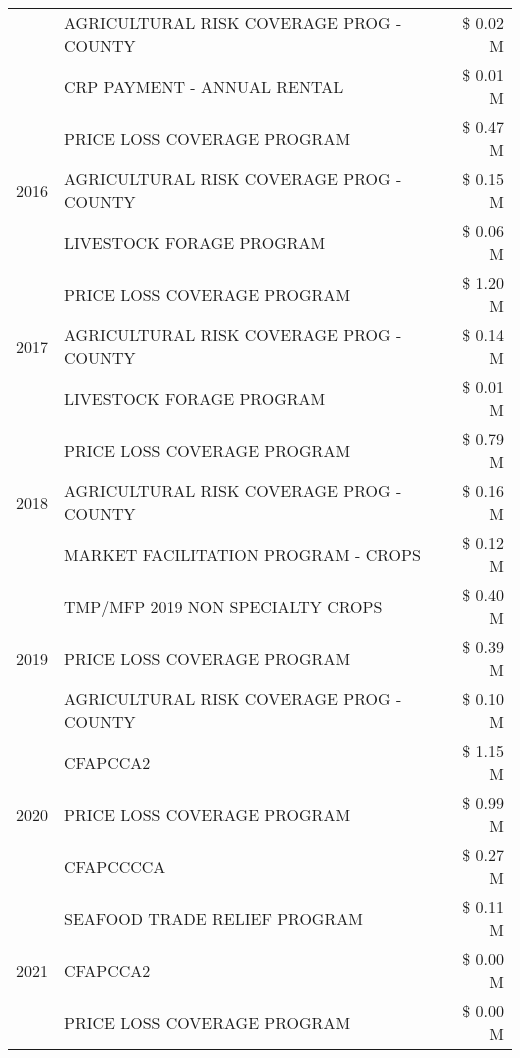 \begin{tabular}{llr}
 & AGRICULTURAL RISK COVERAGE PROG - COUNTY & \$ 0.02 M \\
 & CRP PAYMENT - ANNUAL RENTAL & \$ 0.01 M \\
\cline{1-3}
\multirow[t]{3}{*}{2016} & PRICE LOSS COVERAGE PROGRAM & \$ 0.47 M \\
 & AGRICULTURAL RISK COVERAGE PROG - COUNTY & \$ 0.15 M \\
 & LIVESTOCK FORAGE PROGRAM & \$ 0.06 M \\
\cline{1-3}
\multirow[t]{3}{*}{2017} & PRICE LOSS COVERAGE PROGRAM & \$ 1.20 M \\
 & AGRICULTURAL RISK COVERAGE PROG - COUNTY & \$ 0.14 M \\
 & LIVESTOCK FORAGE PROGRAM & \$ 0.01 M \\
\cline{1-3}
\multirow[t]{3}{*}{2018} & PRICE LOSS COVERAGE PROGRAM & \$ 0.79 M \\
 & AGRICULTURAL RISK COVERAGE PROG - COUNTY & \$ 0.16 M \\
 & MARKET FACILITATION PROGRAM - CROPS & \$ 0.12 M \\
\cline{1-3}
\multirow[t]{3}{*}{2019} & TMP/MFP 2019 NON SPECIALTY CROPS & \$ 0.40 M \\
 & PRICE LOSS COVERAGE PROGRAM & \$ 0.39 M \\
 & AGRICULTURAL RISK COVERAGE PROG - COUNTY & \$ 0.10 M \\
\cline{1-3}
\multirow[t]{3}{*}{2020} & CFAPCCA2 & \$ 1.15 M \\
 & PRICE LOSS COVERAGE PROGRAM & \$ 0.99 M \\
 & CFAPCCCCA & \$ 0.27 M \\
\cline{1-3}
\multirow[t]{3}{*}{2021} & SEAFOOD TRADE RELIEF PROGRAM & \$ 0.11 M \\
 & CFAPCCA2 & \$ 0.00 M \\
 & PRICE LOSS COVERAGE PROGRAM & \$ 0.00 M \\
\cline{1-3}
\bottomrule
\end{tabular}
